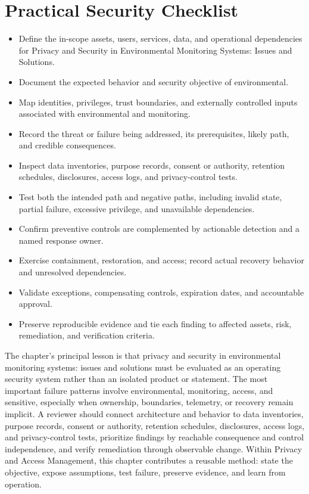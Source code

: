 \documentclass[11pt]{article}
\begin{document}
\section*{Practical Security Checklist}
\begin{itemize}[label=$\square$]
\item Define the in-scope assets, users, services, data, and operational dependencies for Privacy and Security in Environmental Monitoring Systems: Issues and Solutions.
\item Document the expected behavior and security objective of environmental.
\item Map identities, privileges, trust boundaries, and externally controlled inputs associated with environmental and monitoring.
\item Record the threat or failure being addressed, its prerequisites, likely path, and credible consequences.
\item Inspect data inventories, purpose records, consent or authority, retention schedules, disclosures, access logs, and privacy-control tests.
\item Test both the intended path and negative paths, including invalid state, partial failure, excessive privilege, and unavailable dependencies.
\item Confirm preventive controls are complemented by actionable detection and a named response owner.
\item Exercise containment, restoration, and access; record actual recovery behavior and unresolved dependencies.
\item Validate exceptions, compensating controls, expiration dates, and accountable approval.
\item Preserve reproducible evidence and tie each finding to affected assets, risk, remediation, and verification criteria.
\end{itemize}
\begin{synthesisbox}
The chapter's principal lesson is that privacy and security in environmental monitoring systems: issues and solutions must be evaluated as an operating security system rather than an isolated product or statement. The most important failure patterns involve environmental, monitoring, access, and sensitive, especially when ownership, boundaries, telemetry, or recovery remain implicit. A reviewer should connect architecture and behavior to data inventories, purpose records, consent or authority, retention schedules, disclosures, access logs, and privacy-control tests, prioritize findings by reachable consequence and control independence, and verify remediation through observable change. Within Privacy and Access Management, this chapter contributes a reusable method: state the objective, expose assumptions, test failure, preserve evidence, and learn from operation.
\end{synthesisbox}
\end{document}
